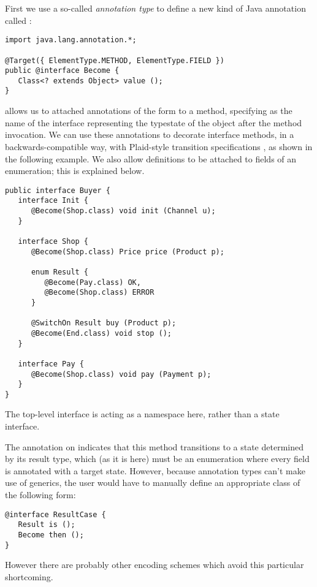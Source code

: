 First we use a so-called \emph{annotation type} to define a new kind
of Java annotation called :

\begin{lstlisting}
import java.lang.annotation.*;

@Target({ ElementType.METHOD, ElementType.FIELD })
public @interface Become {
   Class<? extends Object> value ();
}
\end{lstlisting}

\noindent {} allows us to attached annotations of the form
 to a method, specifying  as the
name of the interface representing the typestate of the object after
the method invocation. We can use these annotations to decorate
interface methods, in a backwards-compatible way, with Plaid-style
transition specifications \cite{garcia14}, as shown in the following
example. We also allow  definitions to be attached to
fields of an enumeration; this is explained below.

\begin{lstlisting}
public interface Buyer {
   interface Init {
      @Become(Shop.class) void init (Channel u);
   }

   interface Shop {
      @Become(Shop.class) Price price (Product p);

      enum Result {
         @Become(Pay.class) OK,
         @Become(Shop.class) ERROR
      }

      @SwitchOn Result buy (Product p);
      @Become(End.class) void stop ();
   }

   interface Pay {
      @Become(Shop.class) void pay (Payment p);
   }
}
\end{lstlisting}

\noindent The top-level  interface is acting as a
namespace here, rather than a state interface.

The  annotation on  indicates that this method
transitions to a state determined by its result type, which (as it is
here) must be an enumeration where every field is annotated with a
target state. However, because annotation types can't make use of
generics, the user would have to manually define an appropriate
 class of the following form:
\begin{lstlisting}
@interface ResultCase {
   Result is ();
   Become then ();
}
\end{lstlisting}

\noindent However there are probably other encoding schemes which
avoid this particular shortcoming.

